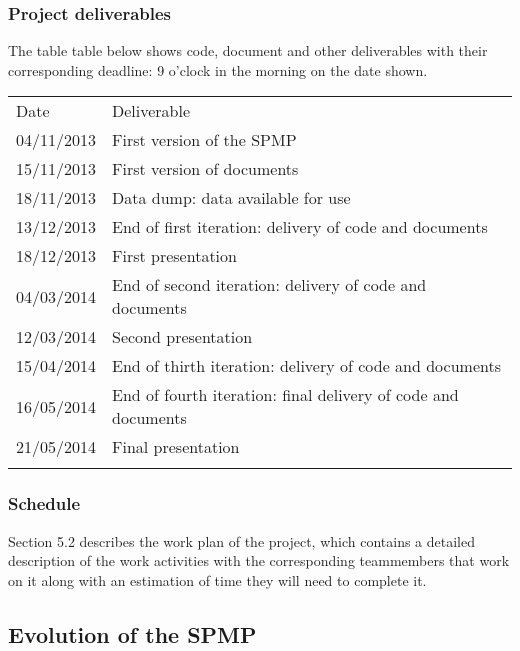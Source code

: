\documentclass[9pt]{article}
\begin{document}
\subsubsection{Project deliverables}\label{project-deliverables}

The table table below shows code, document and other deliverables with
their corresponding deadline: 9 o'clock in the morning on the date
shown.

\begin{longtable}[c]{@{}ll@{}}
\hline\noalign{\medskip}
Date & Deliverable
\\\noalign{\medskip}
\hline\noalign{\medskip}
04/11/2013 & First version of the SPMP
\\\noalign{\medskip}
15/11/2013 & First version of documents
\\\noalign{\medskip}
18/11/2013 & Data dump: data available for use
\\\noalign{\medskip}
13/12/2013 & End of first iteration: delivery of code and documents
\\\noalign{\medskip}
18/12/2013 & First presentation
\\\noalign{\medskip}
04/03/2014 & End of second iteration: delivery of code and documents
\\\noalign{\medskip}
12/03/2014 & Second presentation
\\\noalign{\medskip}
15/04/2014 & End of thirth iteration: delivery of code and documents
\\\noalign{\medskip}
16/05/2014 & End of fourth iteration: final delivery of code and
documents
\\\noalign{\medskip}
21/05/2014 & Final presentation
\\\noalign{\medskip}
\hline
\end{longtable}

\subsubsection{Schedule}\label{schedule}

Section 5.2 describes the work plan of the project, which contains a
detailed description of the work activities with the corresponding
teammembers that work on it along with an estimation of time they will
need to complete it.

\subsection{Evolution of the SPMP}\label{evolution-of-the-spmp}
\end{document}
